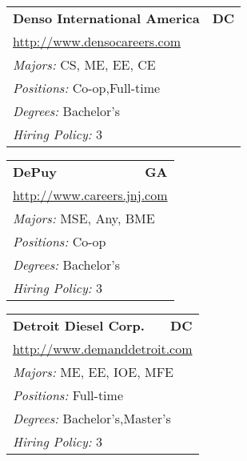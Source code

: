\documentclass[twoside]{article}
\begin{document}
\begin{center}
\begin{multicols}{3}
\begin{FlushLeft}
\begin{minipage}{\columnwidth}
\end{minipage}
 
\begin{minipage}{\columnwidth}\begin{tabularx}{.95\columnwidth}{Xr}
                 {\Large\bf Denso International America} & {\Large\bf DC}\\
    \multicolumn{2}{p{.95\columnwidth}}{\url{http://www.densocareers.com}}\\
    \multicolumn{2}{p{.95\columnwidth}}{\emph{Majors:} CS, ME, EE, CE}\\
    \multicolumn{2}{p{.95\columnwidth}}{\emph{Positions:} Co-op,Full-time}\\
    \multicolumn{2}{p{.95\columnwidth}}{\emph{Degrees:} Bachelor's}\\
    \multicolumn{2}{p{.95\columnwidth}}{\emph{Hiring Policy:} 3}\\
    \end{tabularx}
    
\end{minipage}
 
\begin{minipage}{\columnwidth}\begin{tabularx}{.95\columnwidth}{Xr}
                 {\Large\bf DePuy} & {\Large\bf GA}\\
    \multicolumn{2}{p{.95\columnwidth}}{\url{http://www.careers.jnj.com}}\\
    \multicolumn{2}{p{.95\columnwidth}}{\emph{Majors:} MSE, Any, BME}\\
    \multicolumn{2}{p{.95\columnwidth}}{\emph{Positions:} Co-op}\\
    \multicolumn{2}{p{.95\columnwidth}}{\emph{Degrees:} Bachelor's}\\
    \multicolumn{2}{p{.95\columnwidth}}{\emph{Hiring Policy:} 3}\\
    \end{tabularx}
    
\end{minipage}
 
\begin{minipage}{\columnwidth}\begin{tabularx}{.95\columnwidth}{Xr}
                 {\Large\bf Detroit Diesel Corp.} & {\Large\bf DC}\\
    \multicolumn{2}{p{.95\columnwidth}}{\url{http://www.demanddetroit.com}}\\
    \multicolumn{2}{p{.95\columnwidth}}{\emph{Majors:} ME, EE, IOE, MFE}\\
    \multicolumn{2}{p{.95\columnwidth}}{\emph{Positions:} Full-time}\\
    \multicolumn{2}{p{.95\columnwidth}}{\emph{Degrees:} Bachelor's,Master's}\\
    \multicolumn{2}{p{.95\columnwidth}}{\emph{Hiring Policy:} 3}\\
    \end{tabularx}
    

\end{minipage}
\end{FlushLeft}
\end{multicols}
\end{center}
\end{document}
